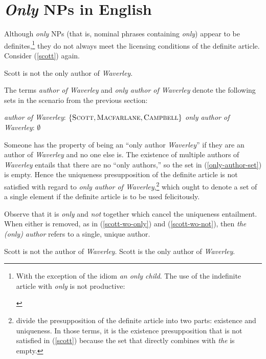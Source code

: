 \section{\textit{Only} NPs in English \label{sec:only-nps-english}}
Although \textit{only} NPs (that is, nominal phrases containing \textit{only}) appear to be definites,\footnote{With the exception of the idiom \textit{an only child}. The use of the indefinite article with \textit{only} is not productive: \begin{exe}  \end{exe}} they do not always meet the licensing conditions of the definite article. Consider (\ref{scott}) again.

\begin{exe}
	 Scott is not the only author of \textit{Waverley}.
\end{exe}

The terms \textit{author of Waverley} and \textit{only author of Waverley} denote the following sets in the scenario from the previous section:

\begin{exe}
	\ex \textit{author of Waverley}: $\lbrace \textsc{Scott}, \textsc{Macfarlane}, \textsc{Campbell} \rbrace$
	\ex \label{only-author-set} \textit{only author of Waverley}: $\emptyset$
\end{exe}

Someone has the property of being an ``only author \textit{Waverley}'' if they are an author of \textit{Waverley} and no one else is. The existence of multiple authors of \textit{Waverley} entails that there are no ``only authors,'' so the set in (\ref{only-author-set}) is empty. Hence the uniqueness presupposition of the definite article is not satisfied with regard to \textit{only author of Waverley},\footnote{\citet{cb2015} divide the presupposition of the definite article into two parts: existence and uniqueness. In those terms, it is the existence presupposition that is not satisfied in (\ref{scott}) because the set that directly combines with \textit{the} is empty.} which ought to denote a set of a single element if the definite article is to be used felicitously.

Observe that it is \textit{only} and \textit{not} together which cancel the uniqueness entailment. When either is removed, as in (\ref{scott-wo-only}) and (\ref{scott-wo-not}), then \textit{the (only) author} refers to a single, unique author.

\begin{exe}
	\ex \label{scott-wo-only} Scott is not the author of \textit{Waverley}.
	\ex \label{scott-wo-not} Scott is the only author of \textit{Waverley}.
\end{exe}

